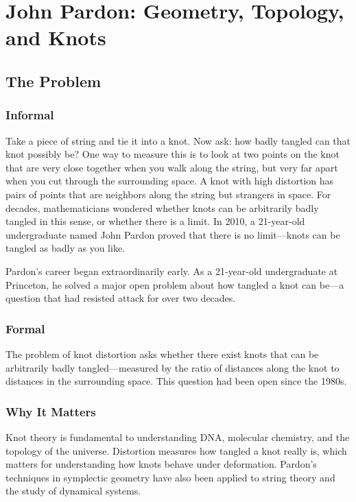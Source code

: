 \let\LocalMacro\relax

\chapter{John Pardon: Geometry, Topology, and Knots}

\section{The Problem}

\subsection{Informal}
Take a piece of string and tie it into a knot. Now ask: how badly tangled can that knot possibly be? One way to measure this is to look at two points on the knot that are very close together when you walk along the string, but very far apart when you cut through the surrounding space. A knot with high distortion has pairs of points that are neighbors along the string but strangers in space. For decades, mathematicians wondered whether knots can be arbitrarily badly tangled in this sense, or whether there is a limit. In 2010, a 21-year-old undergraduate named John Pardon proved that there is no limit---knots can be tangled as badly as you like.

\begin{historicalbox}
Pardon's career began extraordinarily early. As a 21-year-old undergraduate at Princeton, he solved a major open problem about how tangled a knot can be---a question that had resisted attack for over two decades.
\end{historicalbox}

\subsection{Formal}

The problem of knot distortion asks whether there exist knots that can be arbitrarily badly tangled---measured by the ratio of distances along the knot to distances in the surrounding space. This question had been open since the 1980s.

\subsection{Why It Matters}
Knot theory is fundamental to understanding DNA, molecular chemistry, and the topology of the universe. Distortion measures how tangled a knot really is, which matters for understanding how knots behave under deformation. Pardon's techniques in symplectic geometry have also been applied to string theory and the study of dynamical systems.

